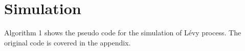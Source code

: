 \section{Simulation}
Algorithm 1 shows the pseudo code for the simulation of Lévy process. The original code is covered in the appendix. 

